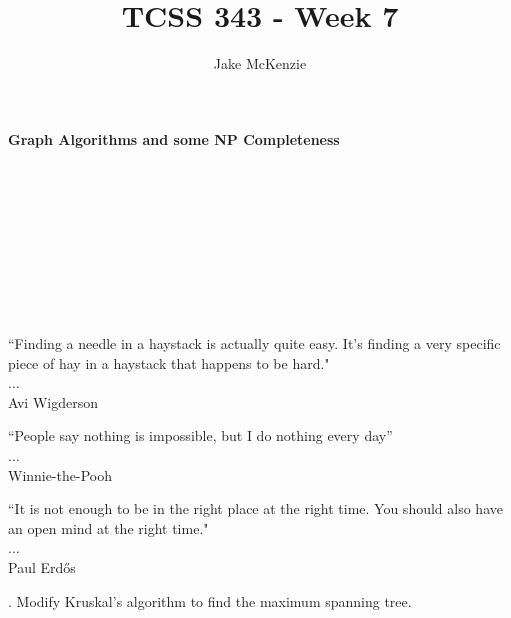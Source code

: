 \documentclass[12pt]{article}
\begin{document}
\title{TCSS 343 - Week 7}
\author{Jake McKenzie}
\maketitle
\noindent\centerline{\textbf{Graph Algorithms and some NP Completeness}}\\\\\\\\\\\\\\\\
\begin{center}
    ``Finding a needle in a haystack is actually quite easy. It's finding a very specific piece of hay in a haystack that happens to be hard." \\$\dots$\\ Avi Wigderson
\end{center}
\begin{center}
    ``People say nothing is impossible, but I do nothing every day'' \\$\dots$\\ Winnie-the-Pooh
\end{center}
\begin{center}
    ``It is not enough to be in the right place at the right time. You should also have an open mind at the right time." \\$\dots$\\ Paul Erd\H{o}s
\end{center}
\newpage
{}. Modify Kruskal's algorithm to find the maximum spanning tree.\\
\end{document}
